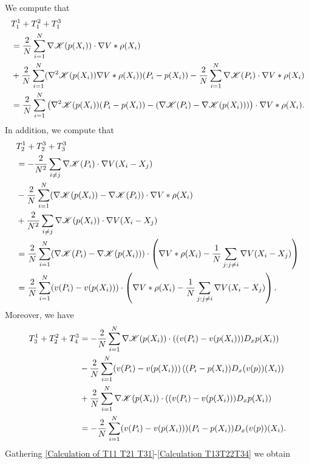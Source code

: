 \documentclass[11pt,reqno]{amsart}
\numberwithin{equation}{section}
\begin{document}
We compute that 
\begin{align}
&T^{1}_{1}+T^{2}_{1}+T^{3}_{1} \notag\\
&=  \frac{2}{N}\sum_{i=1}^{N}\nabla \mathscr{K}(p(X_{i}))\cdot \nabla V\ast \rho(X_{i}) \notag\\
&+\frac{2}{N}\sum_{i=1}^{N}(\nabla^{2}\mathscr{K}(p(X_{i}))\nabla V\ast \rho(X_{i}))(P_{i}-p(X_{i}))-\frac{2}{N}\sum_{i=1}^{N}\nabla \mathscr{K}(P_{i})\cdot \nabla V\ast \rho(X_{i}) \notag\\
&=\frac{2}{N}\sum_{i=1}^{N}\left(\nabla^{2} \mathscr{K}(p(X_{i}))(P_{i}-p(X_{i}))-(\nabla \mathscr{K}(P_{i})-\nabla \mathscr{K}(p(X_{i})))\right)\cdot \nabla V\ast \rho(X_{i}). \label{Calculation of T11 T21 T31}
\end{align}
In addition, we compute that  
\begin{align}
&T^{1}_{2}+T^{3}_{2}+T^{3}_{3} \notag\\
&=-\frac{2}{N^
{2}}\sum_{i\neq j}\nabla \mathscr{K}(P_{i})\cdot \nabla V(X_{i}-X_{j}) \notag\\
&-\frac{2}{N}\sum_{i=1}^{N}(\nabla \mathscr{K}(p(X_{i}))-\nabla \mathscr{K}(P_{i}))\cdot \nabla V\ast \rho(X_{i}) \notag\\
&+\frac{2}{N^{2}}\sum_{i\neq j}\nabla \mathscr{K}(p(X_{i}))\cdot \nabla V(X_{i}-X_{j}) \notag\\
&=\frac{2}{N}\sum_{i=1}^{N}(\nabla \mathscr{K}(P_{i})-\nabla \mathscr{K}(p(X_{i})))\cdot \left(\nabla V\ast \rho(X_{i})-\frac{1}{N}\sum_{j:j\neq i}\nabla V(X_{i}-X_{j})\right)\notag\\
&=\frac{2}{N}\sum_{i=1}^{N}(v(P_{i})-v(p(X_{i})))\cdot \left(\nabla V\ast \rho(X_{i})-\frac{1}{N}\sum_{j:j\neq i}\nabla V(X_{i}-X_{j})\right). 
\end{align}
Moreover, we have 
\begin{align}
T_{3}^{1}+T^{2}_{2}+T^{3}_{4}&=  -\frac{2}{N}\sum_{i=1}^{N}\nabla \mathscr{K}(p(X_{i}))\cdot \left((v(P_{i})-v(p(X_{i})))D_{x}p(X_{i})\right)\notag\\
&-\frac{2}{N}\sum_{i=1}^{N}(v(P_{i})-v(p(X_{i})))\left((P_{i}-p(X_{i}))D_{x}(v(p))(X_{i})\right) \notag\\
&+\frac{2}{N}\sum_{i=1}^{N}\nabla \mathscr{K}(p(X_{i}))\cdot \left((v(P_{i})-v(p(X_{i})))D_{x}p(X_{i})\right) \notag\\
&=-\frac{2}{N}\sum_{i=1}^{N}(v(P_{i})-v(p(X_{i})))(P_{i}-p(X_{i}))D_{x}(v(p))(X_{i}).
\label{Calculation T13T22T34} 
\end{align}
Gathering \eqref{Calculation of T11 T21 T31}-\eqref{Calculation T13T22T34} we obtain 
\end{document}
